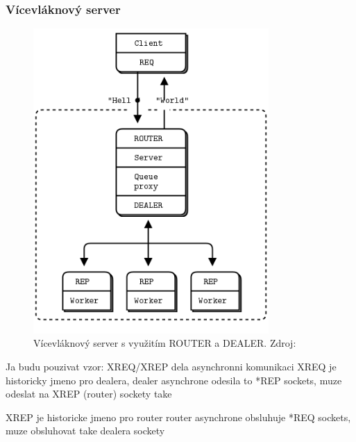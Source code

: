\documentclass[thesis=M,czech]{FITthesis}[2014/05/07]
\begin{document}
\subsubsection{Vícevláknový server}
\begin{figure}\centering
	\includegraphics[width=0.8\textwidth]{obr/multithreadingServer.png}
 	\caption[Vícevláknový server s využitím ROUTER a DEALER.]{Vícevláknový server s využitím ROUTER a DEALER. Zdroj: \cite{mtserver}}\label{fig:mtserver}
\end{figure}	

Ja budu pouzivat vzor: XREQ/XREP
dela asynchronni komunikaci
XREQ je historicky jmeno pro dealera, dealer asynchrone odesila to *REP  sockets, muze odeslat na XREP (router) sockety take

XREP je historicke jmeno pro router
router asynchrone obsluhuje *REQ sockets, muze obsluhovat take dealera sockety
\end{document}
